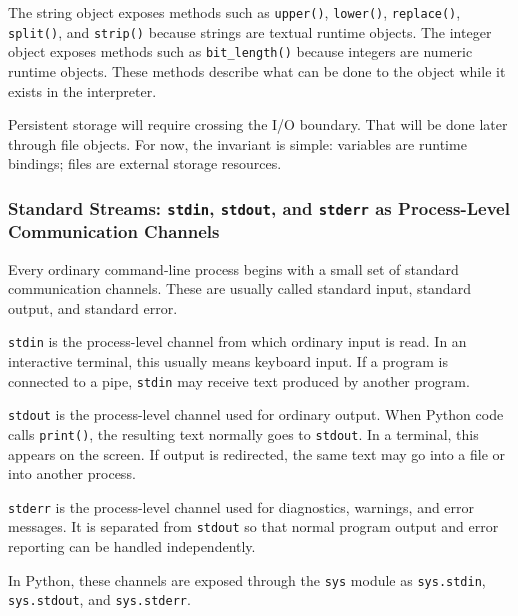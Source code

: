 The string object exposes methods such as \texttt{upper()}, \texttt{lower()}, \texttt{replace()}, \texttt{split()}, and \texttt{strip()} because strings are textual runtime objects. The integer object exposes methods such as \texttt{bit\_length()} because integers are numeric runtime objects. These methods describe what can be done to the object while it exists in the interpreter.

Persistent storage will require crossing the I/O boundary. That will be done later through file objects. For now, the invariant is simple: variables are runtime bindings; files are external storage resources.

\subsubsection{Standard Streams: \texttt{stdin}, \texttt{stdout}, and \texttt{stderr} as Process-Level Communication Channels}

Every ordinary command-line process begins with a small set of standard communication channels. These are usually called standard input, standard output, and standard error.

\texttt{stdin} is the process-level channel from which ordinary input is read. In an interactive terminal, this usually means keyboard input. If a program is connected to a pipe, \texttt{stdin} may receive text produced by another program.

\texttt{stdout} is the process-level channel used for ordinary output. When Python code calls \texttt{print()}, the resulting text normally goes to \texttt{stdout}. In a terminal, this appears on the screen. If output is redirected, the same text may go into a file or into another process.

\texttt{stderr} is the process-level channel used for diagnostics, warnings, and error messages. It is separated from \texttt{stdout} so that normal program output and error reporting can be handled independently.

In Python, these channels are exposed through the \texttt{sys} module as \texttt{sys.stdin}, \texttt{sys.stdout}, and \texttt{sys.stderr}.

